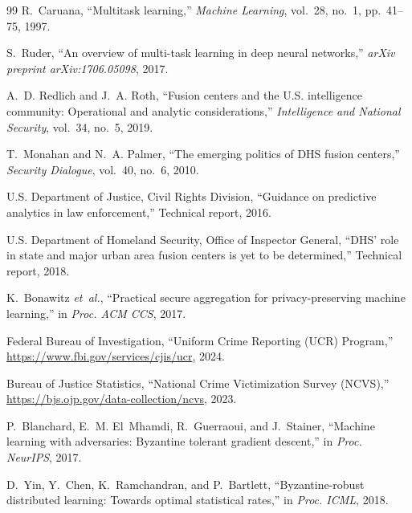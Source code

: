 \documentclass[conference]{IEEEtran}
\begin{document}
\begin{thebibliography}{99}
R.~Caruana,
``Multitask learning,''
\emph{Machine Learning}, vol.~28, no.~1, pp.~41--75, 1997.

S.~Ruder,
``An overview of multi-task learning in deep neural networks,''
\emph{arXiv preprint arXiv:1706.05098}, 2017.

A.~D. Redlich and J.~A. Roth,
``Fusion centers and the U.S. intelligence community: Operational and analytic considerations,''
\emph{Intelligence and National Security}, vol.~34, no.~5, 2019.

T.~Monahan and N.~A. Palmer,
``The emerging politics of DHS fusion centers,''
\emph{Security Dialogue}, vol.~40, no.~6, 2010.

U.S. Department of Justice, Civil Rights Division,
``Guidance on predictive analytics in law enforcement,''
Technical report, 2016.

U.S. Department of Homeland Security, Office of Inspector General,
``DHS' role in state and major urban area fusion centers is yet to be determined,''
Technical report, 2018.

K.~Bonawitz \emph{et~al.},
``Practical secure aggregation for privacy-preserving machine learning,''
in \emph{Proc. ACM CCS}, 2017.

Federal Bureau of Investigation,
``Uniform Crime Reporting (UCR) Program,''
\url{https://www.fbi.gov/services/cjis/ucr}, 2024.

Bureau of Justice Statistics,
``National Crime Victimization Survey (NCVS),''
\url{https://bjs.ojp.gov/data-collection/ncvs}, 2023.

P.~Blanchard, E.~M. El~Mhamdi, R.~Guerraoui, and J.~Stainer,
``Machine learning with adversaries: Byzantine tolerant gradient descent,''
in \emph{Proc. NeurIPS}, 2017.

D.~Yin, Y.~Chen, K.~Ramchandran, and P.~Bartlett,
``Byzantine-robust distributed learning: Towards optimal statistical rates,''
in \emph{Proc. ICML}, 2018.

\end{thebibliography}
\end{document}
